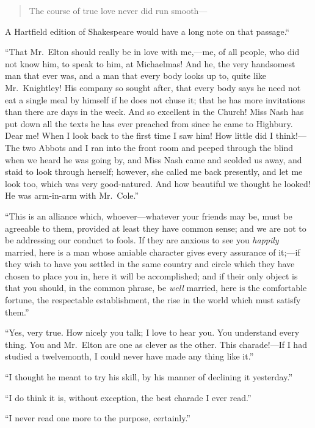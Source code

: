 \begin{verse}
      The course of true love never did run smooth---%
\end{verse}

A Hartfield edition of Shakespeare would have a long note on that passage.``

``That Mr.\ Elton should really be in love with me,---me, of all people,
who did not know him, to speak to him, at Michaelmas! And he,
the very handsomest man that ever was, and a man that every body
looks up to, quite like Mr.\ Knightley! His company so sought after,
that every body says he need not eat a single meal by himself if he
does not chuse it; that he has more invitations than there are days
in the week.  And so excellent in the Church! Miss Nash has put down
all the texts he has ever preached from since he came to Highbury.
Dear me! When I look back to the first time I saw him! How little
did I think!---The two Abbots and I ran into the front room and
peeped through the blind when we heard he was going by, and Miss
Nash came and scolded us away, and staid to look through herself;
however, she called me back presently, and let me look too,
which was very good-natured. And how beautiful we thought he looked!
He was arm-in-arm with Mr.\ Cole.''

``This is an alliance which, whoever---whatever your friends may be,
must be agreeable to them, provided at least they have common sense;
and we are not to be addressing our conduct to fools.  If they
are anxious to see you \emph{happily} married, here is a man whose amiable
character gives every assurance of it;---if they wish to have you
settled in the same country and circle which they have chosen
to place you in, here it will be accomplished; and if their only
object is that you should, in the common phrase, be \emph{well} married,
here is the comfortable fortune, the respectable establishment,
the rise in the world which must satisfy them.''

``Yes, very true.  How nicely you talk; I love to hear you.
You understand every thing.  You and Mr.\ Elton are one as clever
as the other.  This charade!---If I had studied a twelvemonth,
I could never have made any thing like it.''

``I thought he meant to try his skill, by his manner of declining
it yesterday.''

``I do think it is, without exception, the best charade I ever read.''

``I never read one more to the purpose, certainly.''

